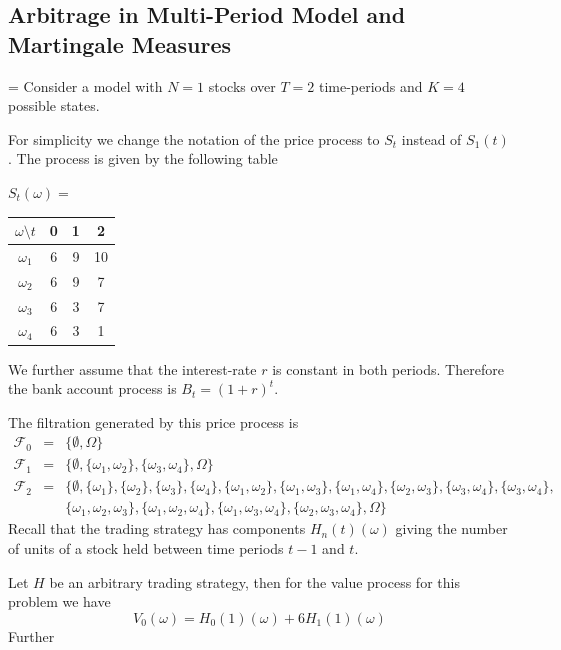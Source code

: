 \documentclass[11pt,a4paper]{article}
\begin{document}
\subsection{Arbitrage in Multi-Period Model and Martingale Measures}

  \begin{example}{}
    \everymath={\displaystyle}
    Consider a model with $N=1$ stocks over $T=2$ time-periods and $K=4$ possible states.
    \par For simplicity we change the notation of the price process to $S_t$ instead of $S_1(t)$. The process is given by the following table
    \begin{center}
      $S_t(\omega)=$
      \begin{tabular}{c|ccc}
        $\omega\setminus t$&0&1&2\\\hline
        $\omega_1$&6&9&10\\
        $\omega_2$&6&9&7\\
        $\omega_3$&6&3&7\\
        $\omega_4$&6&3&1
      \end{tabular}
    \end{center}
    We further assume that the interest-rate $r$ is constant in both periods. Therefore the bank account process is $B_t=(1+r)^t$.
    \par The filtration generated by this price process is
    \[\begin{array}{rcl}
      \mathcal{F}_0&=&\big\{\emptyset,\Omega\big\}\\
      \mathcal{F}_1&=&\big\{\emptyset,\{\omega_1,\omega_2\},\{\omega_3,\omega_4\},\Omega\big\}\\
      \mathcal{F}_2&=&\big\{\emptyset,\{\omega_1\},\{\omega_2\},\{\omega_3\},\{\omega_4\},\{\omega_1,\omega_2\},\{\omega_1,\omega_3\},\{\omega_1,\omega_4\},\{\omega_2,\omega_3\},\{\omega_3,\omega_4\},\{\omega_3,\omega_4\},\\
      &&\{\omega_1,\omega_2,\omega_3\},\{\omega_1,\omega_2,\omega_4\},\{\omega_1,\omega_3,\omega_4\},\{\omega_2,\omega_3,\omega_4\},\Omega\big\}
    \end{array}\]
    Recall that the trading strategy has components $H_n(t)(\omega)$ giving the number of units of a stock held between time periods $t-1$ and $t$.
    \par Let $H$ be an arbitrary trading strategy, then for the value process for this problem we have
    \[ V_0(\omega)=H_0(1)(\omega)+6H_1(1)(\omega) \]
    Further
    \[\begin{array}{rcl}

\end{array}\]
\end{example}
\end{document}
